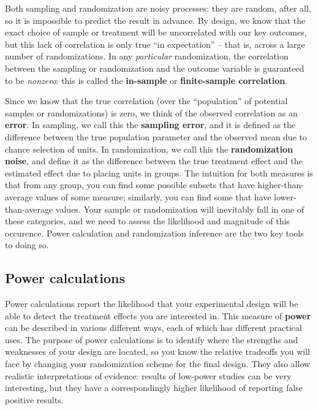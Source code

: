 Both sampling and randomization are noisy processes:
they are random, after all, so it is impossible to predict the result in advance.
By design, we know that the exact choice of sample or treatment
will be uncorrelated with our key outcomes,
but this lack of correlation is only true ``in expectation'' --
that is, across a large number of randomizations.
In any \textit{particular} randomization,
the correlation between the sampling or randomization and the outcome variable
is guaranteed to be \textit{nonzero}:
this is called the \textbf{in-sample} or \textbf{finite-sample correlation}.

Since we know that the true correlation
(over the ``population'' of potential samples or randomizations)
is zero, we think of the observed correlation as an \textbf{error}.
In sampling, we call this the \textbf{sampling error},
and it is defined as the difference between the true population parameter
and the observed mean due to chance selection of units.
In randomization, we call this the \textbf{randomization noise},
and define it as the difference between the true treatment effect
and the estimated effect due to placing units in groups.
The intuition for both measures is that from any group,
you can find some possible subsets that have higher-than-average values of some measure;
similarly, you can find some that have lower-than-average values.
Your sample or randomization will inevitably fall in one of these categories,
and we need to assess the likelihood and magnitude of this occurence.
Power calculation and randomization inference are the two key tools to doing so.

\subsection{Power calculations}

Power calculations report the likelihood that your experimental design
will be able to detect the treatment effects you are interested in.
This measure of \textbf{power} can be described in various different ways,
each of which has different practical uses.
The purpose of power calculations is to identify where the strengths and weaknesses
of your design are located, so you know the relative tradeoffs you will face
by changing your randomization scheme for the final design.
They also allow realistic interpretations of evidence:
results of low-power studies can be very interesting,
but they have a correspondingly higher likelihood
of reporting false positive results.

